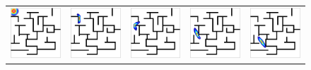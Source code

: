 \begin{figure}[!ht]
\begin{center}
\begin{tabular}{ccccc}
\hspace{-0.2cm}\includegraphics[width=3cm]{images/labyrinthe/bump_obstacle5_iso_001}&
\hspace{-0.4cm}\includegraphics[width=3cm]{images/labyrinthe/bump_obstacle5_iso_012}&
\hspace{-0.4cm}\includegraphics[width=3cm]{images/labyrinthe/bump_obstacle5_iso_023}&
\hspace{-0.4cm}\includegraphics[width=3cm]{images/labyrinthe/bump_obstacle5_iso_034}&
\hspace{-0.4cm}\includegraphics[width=3cm]{images/labyrinthe/bump_obstacle5_iso_045}\\

\end{tabular}
\end{center}
\end{figure}
